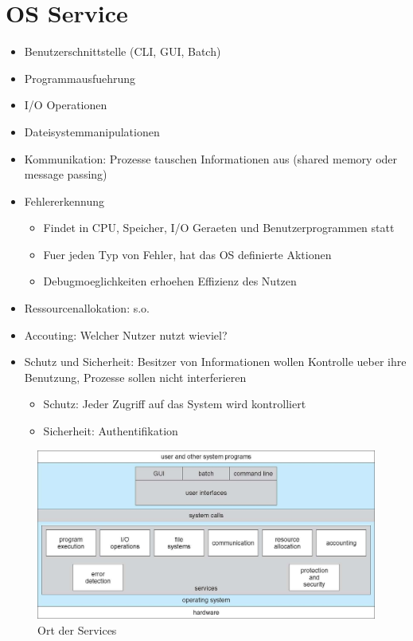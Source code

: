 \documentclass[a4paper]{scrreprt}
\begin{document}
\section{OS Service}
\begin{itemize}
	\item Benutzerschnittstelle (CLI, GUI, Batch)
	\item Programmausfuehrung
	\item I/O Operationen
	\item Dateisystemmanipulationen
	\item Kommunikation: Prozesse tauschen Informationen aus (shared memory oder message passing)
	\item Fehlererkennung
		\begin{itemize}
			\item Findet in CPU, Speicher, I/O Geraeten und Benutzerprogrammen statt
			\item Fuer jeden Typ von Fehler, hat das OS definierte Aktionen
			\item Debugmoeglichkeiten erhoehen Effizienz des Nutzen
		\end{itemize}
	\item Ressourcenallokation: s.o.
	\item Accouting: Welcher Nutzer nutzt wieviel?
	\item Schutz und Sicherheit: Besitzer von Informationen wollen Kontrolle ueber ihre Benutzung, Prozesse sollen nicht interferieren
		\begin{itemize}
			\item Schutz: Jeder Zugriff auf das System wird kontrolliert
			\item Sicherheit: Authentifikation
		\end{itemize}
\end{itemize}

\begin{figure}[ht]
\centering
\includegraphics[scale=0.35]{services.png}
\caption{Ort der Services}
\end{figure}
\end{document}
